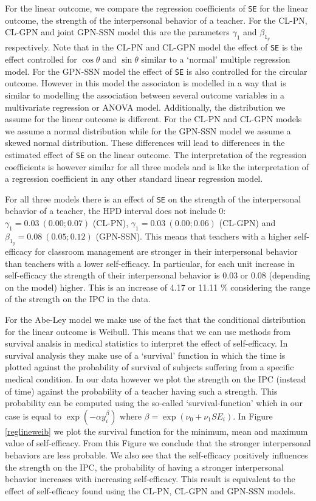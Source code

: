 \documentclass[11pt,]{article}
\begin{document}
For the linear outcome, we compare the regression coefficients of
\verb|SE| for the linear outcome, the strength of the interpersonal
behavior of a teacher. For the CL-PN, CL-GPN and joint GPN-SSN model
this are the parameters \(\gamma_1\) and \(\beta_{1_y}\) respectively.
Note that in the CL-PN and CL-GPN model the effect of \verb|SE| is the
effect controlled for \(\cos\theta\) and \(\sin\theta\) similar to a
`normal' multiple regression model. For the GPN-SSN model the effect of
\verb|SE| is also controlled for the circular outcome. However in this
model the associaton is modelled in a way that is similar to modelling
the association between several outcome variables in a multivariate
regression or ANOVA model. Additionally, the distribution we assume for
the linear outcome is different. For the CL-PN and CL-GPN models we
assume a normal distribution while for the GPN-SSN model we assume a
skewed normal distribution. These differences will lead to differences
in the estimated effect of \verb|SE| on the linear outcome. The
interpretation of the regression coefficients is however similar for all
three models and is like the interpretation of a regression coefficient
in any other standard linear regression model.

For all three models there is an effect of \verb|SE| on the strength of
the interpersonal behavior of a teacher, the HPD interval does not
include 0: \(\gamma_1 = 0.03 \: (0.00; 0.07)\) (CL-PN),
\(\gamma_1 = 0.03 \: (0.00; 0.06)\) (CL-GPN) and
\(\beta_{1_y} = 0.08 \: (0.05; 0.12)\) (GPN-SSN). This means that
teachers with a higher self-efficacy for classroom management are
stronger in their interpersonal behavior than teachers with a lower
self-efficacy. In particular, for each unit increase in self-efficacy
the strength of their interpersonal behavior is 0.03 or 0.08 (depending
on the model) higher. This is an increase of 4.17 or 11.11 \%
considering the range of the strength on the IPC in the data.

For the Abe-Ley model we make use of the fact that the conditional
distribution for the linear outcome is Weibull. This means that we can
use methods from survival analsis in medical statistics to interpret the
effect of self-efficacy. In survival analysis they make use of a
`survival' function in which the time is plotted against the probability
of survival of subjects suffering from a specific medical condition. In
our data however we plot the strength on the IPC (instead of time)
against the probability of a teacher having such a strength. This
probability can be computed using the so-called `survival-function'
which in our case is equal to \(\exp(-\alpha y_i^{\beta})\) where
\(\beta = \exp(\nu_0 + \nu_1SE_i)\). In Figure \ref{reglineweib} we plot
the survival function for the minimum, mean and maximum value of
self-efficacy. From this Figure we conclude that the stronger
interpersonal behaviors are less probable. We also see that the
self-efficacy positively influences the strength on the IPC, the
probability of having a stronger interpersonal behavior increases with
increasing self-efficacy. This result is equivalent to the effect of
self-efficacy found using the CL-PN, CL-GPN and GPN-SSN models.
\end{document}
